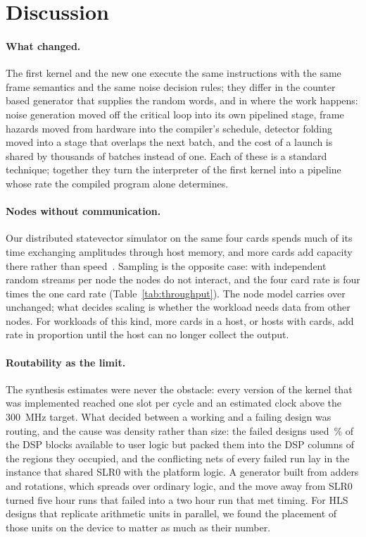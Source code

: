 \section{Discussion}\label{sec:discussion}

\paragraph{What changed.} The first kernel and the new one execute the same instructions with the same frame
semantics and the same noise decision rules; they differ in the counter based generator that supplies the random
words, and in where the work happens: noise generation moved off the critical loop into its own
pipelined stage, frame hazards moved from hardware into the compiler's schedule, detector folding moved into a stage
that overlaps the next batch, and the cost of a launch is shared by thousands of batches instead of one. Each of these
is a standard technique; together they turn the interpreter of the first kernel into a pipeline whose rate the
compiled program alone determines.

\paragraph{Nodes without communication.} Our distributed statevector simulator on the same four cards spends much of
its time exchanging amplitudes through host memory, and more cards add capacity there rather than
speed~\cite{ali2026multifpga}. Sampling is the opposite case: with independent random streams per node the nodes do
not interact, and the four card rate is four times the one card rate (Table~\ref{tab:throughput}). The node model carries over
unchanged; what decides scaling is whether the workload needs data from other nodes. For workloads of this kind,
more cards in a host, or hosts with cards, add rate in proportion until the host can no longer collect the output.

\paragraph{Routability as the limit.} The synthesis estimates were never the obstacle: every version of the kernel that
was implemented reached one slot per cycle and an estimated clock above the 300~MHz target. What decided between a working and a
failing design was routing, and the cause was density rather than size: the failed designs used \NumPhiloxDspCardPct\,\%
of the DSP blocks available to user logic but packed them into the DSP columns of the regions they occupied, and
the conflicting nets of every failed run lay in the instance that shared SLR0 with the platform logic. A generator
built from adders and rotations, which spreads over ordinary logic, and the move away from SLR0 turned five hour runs
that failed into a two hour run that met timing. For HLS designs that replicate arithmetic units in
parallel, we found the placement of those units on the device to matter as much as their number.

